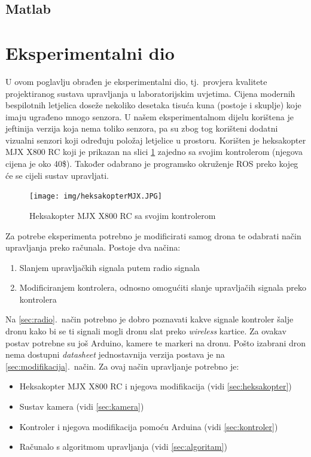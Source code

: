 \documentclass[times, utf8, diplomski]{fer}
\begin{document}
\subsection{Matlab}

\section{Eksperimentalni dio}
U ovom poglavlju obrađen je eksperimentalni dio, tj.~provjera kvalitete projektiranog sustava upravljanja u laboratorijskim uvjetima. 
Cijena modernih bespilotnih letjelica doseže nekoliko desetaka tisuća kuna (postoje i skuplje) koje imaju ugrađeno mnogo senzora. U našem eksperimentalnom dijelu korištena je jeftinija verzija koja nema toliko senzora, pa su zbog tog korišteni dodatni vizualni senzori koji određuju položaj letjelice u prostoru. Korišten je heksakopter MJX X800 RC koji je prikazan na slici \ref{fig:MJX X800 RC} zajedno sa svojim kontrolerom (njegova cijena je oko 40\$). Također odabrano je programsko okruženje ROS preko kojeg će se cijeli sustav upravljati. 
\begin{figure}[htb]
\centering
\texttt{[image: img/heksakopterMJX.JPG]}
\caption{Heksakopter MJX X800 RC sa svojim kontrolerom}
\label{fig:MJX X800 RC}
\end{figure}

Za potrebe eksperimenta potrebno je modificirati samog drona te odabrati način upravljanja preko računala. Postoje dva načina:
\begin{enumerate}
\item Slanjem upravljačkih signala putem radio signala\label{sec:radio}
\item Modificiranjem kontrolera, odnosno omogućiti slanje upravljačih signala preko kontrolera\label{sec:modifikacija}
\end{enumerate}
Na \ref{sec:radio}.~način potrebno je dobro poznavati kakve signale kontroler šalje dronu kako bi se ti signali mogli dronu slat preko \emph{wireless} kartice. Za ovakav postav potrebne su još Arduino, kamere te markeri na dronu. Pošto izabrani dron nema dostupni \emph{datasheet} jednostavnija verzija postava je  na \ref{sec:modifikacija}.~način. Za ovaj način upravljanje potrebno je:
\begin{itemize}
\item Heksakopter MJX X800 RC i njegova modifikacija (vidi \ref{sec:heksakopter})
\item Sustav kamera (vidi \ref{sec:kamera})
\item Kontroler i njegova modifikacija pomoću Arduina (vidi \ref{sec:kontroler})
\item Računalo s algoritmom upravljanja (vidi \ref{sec:algoritam})
\end{itemize}
\end{document}
